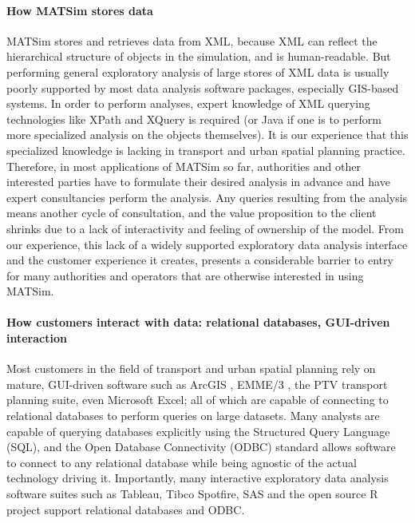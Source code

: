 \paragraph{How MATSim stores data}
MATSim stores and retrieves data from XML, because XML can reflect the hierarchical structure of objects in the simulation, and is human-readable. But performing general exploratory analysis of large stores of XML data is usually poorly supported by most data analysis software packages, especially GIS-based systems. In order to perform analyses, expert knowledge of XML querying technologies like XPath and XQuery is required (or Java if one is to perform more specialized analysis on the objects themselves).  It is our experience that this specialized knowledge is lacking in transport and urban spatial planning practice. Therefore, in most applications of MATSim so far, authorities and other interested parties have to formulate their desired analysis in advance and have expert consultancies perform the analysis. Any queries resulting from the analysis means another cycle of consultation, and the value proposition to the client shrinks due to a lack of interactivity and feeling of ownership of the model. From our experience, this lack of a widely supported exploratory data analysis interface and the customer experience it creates, presents a considerable barrier to entry for many authorities and operators that are otherwise interested in using MATSim.

\paragraph{How customers interact with data: relational databases, GUI-driven interaction}
Most customers in the field of transport and urban spatial planning rely on mature, GUI-driven software such as ArcGIS \citep{ARC_GIS_2011}, EMME/3 \citep{EMME_Webpage_2015}, the PTV \citep{PTV_Webpage_2009} transport planning suite, even Microsoft Excel; all of which are capable of connecting to relational databases to perform queries on large datasets. Many analysts are capable of querying databases explicitly using the Structured Query Language (SQL), and the Open Database Connectivity (ODBC) standard allows software to connect to any relational database while being agnostic of the actual technology driving it. Importantly, many interactive exploratory data analysis software suites such as Tableau, Tibco Spotfire,  SAS and the open source R project support relational databases and ODBC.

